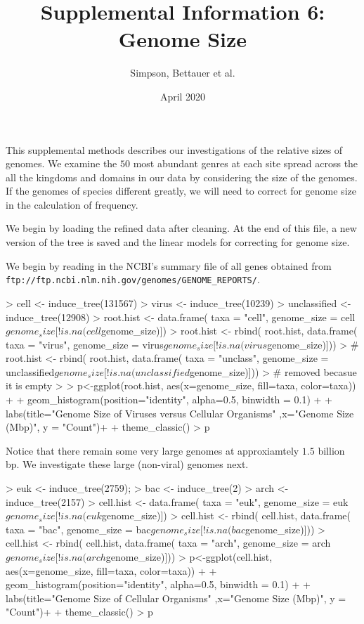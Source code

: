 \documentclass{article}
\title{Supplemental Information 6: Genome Size }
\date{April 2020}
\author{Simpson, Bettauer et al.}
\begin{document}


\maketitle

This supplemental methods describes our investigations of the relative sizes of genomes.
We examine the $50$ most abundant 
 genres at each site spread across the all the kingdoms and domains in our data by considering the size of the genomes. 
If the genomes of species different greatly, we will need to correct for genome size in the calculation
of frequency.

We begin by loading the refined data after cleaning.
At the end of this file, a new version of the tree is saved and the linear models
for correcting for genome size.



We begin by reading in the NCBI's summary file of all genes obtained from {\tt ftp://ftp.ncbi.nlm.nih.gov/genomes/GENOME\_REPORTS/}.


\begin{Schunk}
\begin{Sinput}
> cell <- induce_tree(131567)
> virus <- induce_tree(10239)
> unclassified <- induce_tree(12908)
> root.hist <- data.frame( taxa = "cell", genome_size = cell$genome_size[!is.na(cell$genome_size)])
> root.hist <- rbind( root.hist, data.frame( taxa = "virus", genome_size = virus$genome_size[!is.na(virus$genome_size)]))
> # root.hist <-  rbind( root.hist, data.frame( taxa = "unclass", genome_size = unclassified$genome_size[!is.na(unclassified$genome_size)]))
> # removed becasue it is empty
> 
> p<-ggplot(root.hist, aes(x=genome_size, fill=taxa, color=taxa)) +
+   geom_histogram(position="identity", alpha=0.5, binwidth = 0.1) +
+   labs(title="Genome Size of Viruses versus Cellular Organisms" ,x="Genome Size (Mbp)", y = "Count")+
+   theme_classic()
> p
\end{Sinput}
\end{Schunk}

Notice that there remain some very large genomes at approxiamtely $1.5$ billion bp. We investigate these large (non-viral) genomes next.
\begin{Schunk}
\begin{Sinput}
> euk <- induce_tree(2759);       
> bac <- induce_tree(2)   
> arch <- induce_tree(2157)
> cell.hist <- data.frame( taxa = "euk", genome_size = euk$genome_size[!is.na(euk$genome_size)])
> cell.hist <- rbind( cell.hist, data.frame( taxa = "bac", genome_size = bac$genome_size[!is.na(bac$genome_size)]))
> cell.hist <- rbind( cell.hist, data.frame( taxa = "arch", genome_size = arch$genome_size[!is.na(arch$genome_size)]))
> p<-ggplot(cell.hist, aes(x=genome_size, fill=taxa, color=taxa)) +
+   geom_histogram(position="identity", alpha=0.5, binwidth = 0.1) +
+   labs(title="Genome Size of Cellular Organisms" ,x="Genome Size (Mbp)", y = "Count")+
+   theme_classic()
> p
\end{Sinput}
\end{Schunk}
\end{document}
